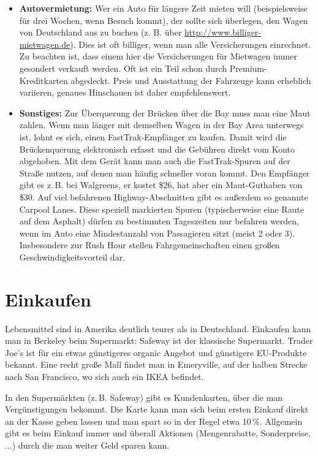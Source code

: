 \documentclass[a4paper]{scrreprt}
\begin{document}
\begin{itemize}
	\item \textbf{Autovermietung:} Wer ein Auto für längere Zeit mieten will (beispielsweise für drei Wochen, wenn Besuch kommt), der sollte sich überlegen, den Wagen von Deutschland aus zu buchen (z. B. über  \url{http://www.billiger-mietwagen.de}). Dies ist oft billiger, wenn man alle Versicherungen einrechnet. Zu beachten ist, dass einem hier die Versicherungen für Mietwagen immer gesondert verkauft werden. Oft ist ein Teil schon durch Premium-Kreditkarten abgedeckt. Preis und Ausstattung der Fahrzeuge kann erheblich variieren, genaues Hinschauen ist daher empfehlenswert.

	\item \textbf{Sonstiges:} Zur Überquerung der Brücken über die Bay muss man eine Maut zahlen. Wenn man länger mit demselben Wagen in der Bay Area unterwegs ist, lohnt es sich, einen FastTrak-Empfänger zu kaufen. Damit wird die Brückenquerung elektronisch erfasst und die Gebühren direkt vom Konto abgehoben. Mit dem Gerät kann man auch die FastTrak-Spuren auf der Straße nutzen, auf denen man häufig schneller voran kommt. Den Empfänger gibt es z.\,B. bei Walgreens, er kostet \$26, hat aber ein Maut-Guthaben von \$30. Auf viel befahrenen Highway-Abschnitten gibt es außerdem so genannte Carpool Lanes. Diese speziell markierten Spuren (typischerweise eine Raute auf dem Asphalt) dürfen zu bestimmten Tageszeiten nur befahren werden, wenn im Auto eine Mindestanzahl von Passagieren sitzt (meist 2 oder 3). Insbesondere zur Rush Hour stellen Fahrgemeinschaften einen großen Geschwindigkeitsvorteil dar.

\end{itemize}

\section{Einkaufen}

Lebensmittel sind in Amerika deutlich teurer als in
Deutschland. Einkaufen kann man in Berkeley beim Supermarkt: Safeway
ist der klassische Supermarkt. Trader Joe's ist für ein etwas
günstigeres organic Angebot und günstigere EU-Produkte bekannt. Eine
recht große Mall findet man in Emeryville, auf der halben Strecke nach
San Francisco, wo sich auch ein IKEA befindet. 

In den Supermärkten (z.\,B. Safeway) gibt es Kundenkarten, über die man
Vergünstigungen bekommt. Die Karte kann man sich beim ersten Einkauf
direkt an der Kasse geben lassen und man spart so in der Regel etwa
10\,\%. Allgemein gibt es beim Einkauf immer und überall Aktionen
(Mengenrabatte, Sonderpreise, ...) durch die man weiter Geld sparen
kann. 
\end{document}
